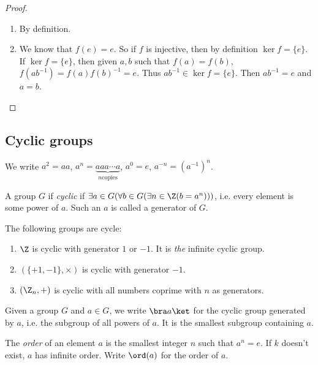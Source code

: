 \documentclass[a4paper]{article}
\begin{document}
  \begin{proof}\leavevmode
    \begin{enumerate}
      \item By definition.
      \item We know that $f(e) = e$. So if $f$ is injective, then by definition $\ker f = \{e\}$. If $\ker f = \{e\}$, then given $a, b$ such that $f(a) = f(b)$, $f(ab^{-1}) = f(a)f(b)^{-1} = e$. Thus $ab^{-1}\in \ker f = \{e\}$.  Then $ab^{-1} = e$ and $a = b$.
    \end{enumerate}
  \end{proof}

  \subsection{Cyclic groups}
  \begin{notation}
    We write $a^2 = aa$, $a^n = \underbrace{aaa\cdots a}_{n \text{copies}}$, $a^0 = e$, $a^{-n} = (a^{-1})^n$.
  \end{notation}

  \begin{defi}
    A group $G$ if \emph{cyclic} if $\exists a\in G(\forall b\in G(\exists n\in\Z(b=a^n)))$, i.e. every element is some power of $a$. Such an $a$ is called a generator of $G$.
  \end{defi}

  \begin{eg}
    The following groups are cycle:
    \begin{enumerate}
      \item $\Z$ is cyclic with generator $1$ or $-1$. It is \emph{the} infinite cyclic group.
      \item $(\{+1, -1\}, \times)$ is cyclic with generator $-1$.
      \item $(\Z_n, +)$ is cyclic with all numbers coprime with $n$ as generators.
    \end{enumerate}
  \end{eg}

  \begin{notation}
    Given a group $G$ and $a\in G$, we write $\bra a\ket$ for the cyclic group generated by $a$, i.e. the subgroup of all powers of $a$. It is the smallest subgroup containing $a$.
  \end{notation}

  \begin{defi}
    The \emph{order} of an element $a$ is the smallest integer $n$ such that $a^n = e$. If $k$ doesn't exist, $a$ has infinite order. Write $\ord(a)$ for the order of $a$.
  \end{defi}
\end{document}
